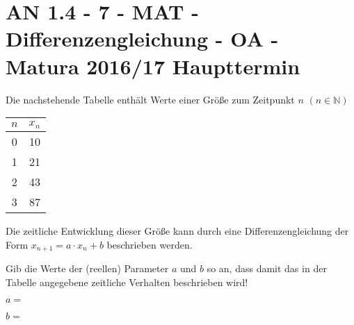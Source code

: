 \section{AN 1.4 - 7 - MAT - Differenzengleichung - OA - Matura 2016/17 Haupttermin}

\begin{beispiel}[AN 1.4]{1} %
Die nachstehende Tabelle enthält Werte einer Größe zum Zeitpunkt $n$ $(n \in \mathbb{N})$

\begin{center}
\begin{tabular}{|c|c|}\hline
\cellcolor{black!20} $n$ & \cellcolor{black!20} $x_n$ \\ \hline
0 & 10 \\ \hline
1 & 21 \\ \hline
2 & 43 \\ \hline
3 & 87 \\ \hline
\end{tabular}
\end{center}

Die zeitliche Entwicklung dieser Größe kann durch eine Differenzengleichung der Form
$x_{n+1} = a \cdot x_n + b$ beschrieben werden. \leer

Gib die Werte der (reellen) Parameter $a$ und $b$ so an, dass damit das in der Tabelle angegebene zeitliche Verhalten beschrieben wird! \leer

$a=$ 

$b=$  


\end{beispiel}